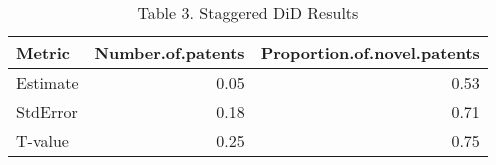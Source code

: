 \documentclass[12pt]{article}
\begin{document}
\begin{table}[ht]
\centering
\begin{tabular}{lrr}
  \hline
Metric & Number.of.patents & Proportion.of.novel.patents \\ 
  \hline
Estimate & 0.05 & 0.53 \\ 
  StdError & 0.18 & 0.71 \\ 
  T-value & 0.25 & 0.75 \\ 
   \hline
\end{tabular}
\caption{Table 3. Staggered DiD Results} 
\label{tab:stag_did}
\end{table}
\end{document}
